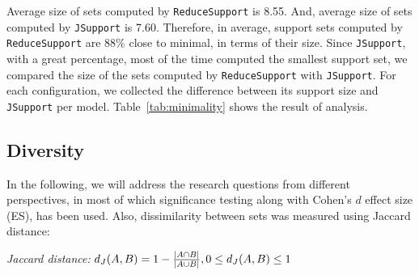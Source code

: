 Average size of sets computed by \texttt{ReduceSupport} is 8.55. And, average size of sets computed by \texttt{JSupport} is 7.60. Therefore, in average, support sets computed by \texttt{ReduceSupport} are 88\% close to minimal, in terms of their size.  %
Since \texttt{JSupport}, with a great percentage, most of the time computed the smallest support set, we compared the size of the sets computed by \texttt{ReduceSupport} with \texttt{JSupport}. For each configuration, we collected the difference between its support size and \texttt{JSupport} per model. Table~\ref{tab:minimality} shows the result of analysis.

\subsection{Diversity}
In the following, we will address the research questions from different perspectives, in most of which significance testing along with Cohen's $d$ effect size (ES), has been used. Also, dissimilarity between sets was measured using Jaccard distance:
\begin{definition}{\emph{Jaccard distance:}}
  \label{def:dj}
  $d_J(\small{A}, \small{B}) = 1 - \frac{|A \cap B|}{|A \cup B|} ,\\ 0 \leq d_J(\small{A}, \small{B}) \leq 1$
\end{definition}


